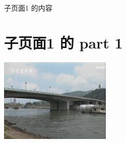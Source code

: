 \documentclass[UTF8]{ctexart}
\begin{document}
	
子页面1 的内容

\part{子页面1 的 part 1}

\includegraphics[width=0.4\textwidth]{img/j1.jpg}
\end{document}
